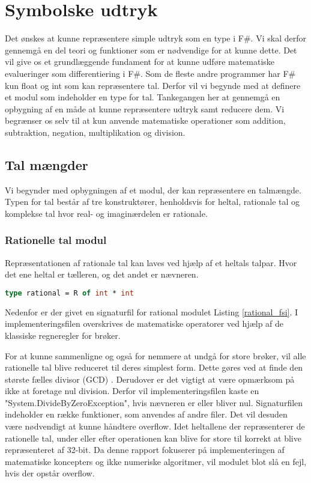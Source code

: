\section{Symbolske udtryk}
Det ønskes at kunne repræsentere simple udtryk som en type i F\#. Vi skal derfor gennemgå en del teori og funktioner som er nødvendige for at kunne dette. Det vil give os et grundlæggende fundament for at kunne udføre matematiske evalueringer som differentiering i F\#. Som de fleste andre programmer har F\# kun float og int som kan repræsentere tal. Derfor vil vi begynde med at definere et modul som indeholder en type for tal. Tankegangen her at gennemgå en opbygning af en måde at kunne repræsentere udtryk samt reducere dem. Vi begrænser os selv til at kun anvende matematiske operationer som addition, subtraktion, negation, multiplikation og division.

\subsection{Tal mængder}
Vi begynder med opbygningen af et modul, der kan repræsentere en talmængde. Typen for tal består af tre konstruktører, henholdsvis for heltal, rationale tal og komplekse tal hvor real- og imaginærdelen er rationale. 

\subsubsection{Rationelle tal modul}\label{sec:rational}
Repræsentationen af rationale tal kan laves ved hjælp af et heltals talpar. Hvor det ene heltal er tælleren, og det andet er nævneren.


\begin{lstlisting}[language={FSharp}, 
    label={type_rationel},
    caption={Typen for rationelle tal}]
type rational = R of int * int
\end{lstlisting}
Nedenfor er der givet en signaturfil for rational modulet Listing \ref{rational_fsi}. I implementeringsfilen overskrives de matematiske operatorer ved hjælp af de klassiske regneregler for brøker.


For at kunne sammenligne og også for nemmere at undgå for store brøker, vil alle rationelle tal blive reduceret til deres simplest form. Dette gøres ved at finde den største fælles divisor (GCD) . Derudover er det vigtigt at være opmærksom på ikke at foretage nul division. Derfor vil implementeringsfilen kaste en "System.DivideByZeroException", hvis nævneren er eller bliver nul. Signaturfilen indeholder en række funktioner, som anvendes af andre filer. Det vil desuden være nødvendigt at kunne håndtere overflow. Idet heltallene der repræsenterer de rationelle tal, under eller efter operationen kan blive for store til korrekt at blive repræsenteret af 32-bit. Da denne rapport fokuserer på implementeringen af matematiske koncepters og ikke numeriske algoritmer, vil modulet blot slå en fejl, hvis der opstår overflow.
 


